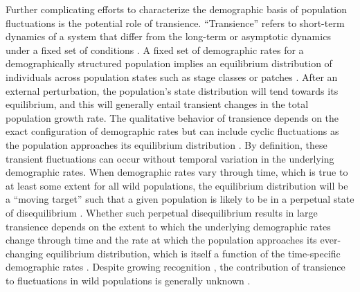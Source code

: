 \documentclass[11pt]{article}
\begin{document}
Further complicating efforts to characterize the demographic basis 
of population fluctuations is the potential role of transience.
``Transience'' refers to short-term dynamics of a system 
that differ from the long-term or asymptotic dynamics under a fixed set of conditions
\citep{hastings2010}.
A fixed set of demographic rates for a demographically structured population 
implies an equilibrium distribution
of individuals across population states such as stage classes or patches
\citep{caswell2001matrix}.
After an external perturbation, 
the population's state distribution will tend towards its equilibrium,
and this will generally entail transient changes 
in the total population growth rate.
The qualitative behavior of transience depends
on the exact configuration of demographic rates
but can include cyclic fluctuations 
as the population approaches its equilibrium distribution
\citep{caswell2001matrix}.
By definition, these transient fluctuations can occur without
temporal variation in the underlying demographic rates.
When demographic rates vary through time,
which is true to at least some extent for all wild populations,
the equilibrium distribution will be a ``moving target''
such that a given population is likely to be in a perpetual state of disequilibrium
\citep{fox2000population, koons2017understanding}.
Whether such perpetual disequilibrium results in large transience 
depends on the extent to which the underlying demographic rates change through time
and the rate at which the population approaches its ever-changing equilibrium distribution,
which is itself a function of the time-specific demographic rates
\citep{caswell2005reactivity, caswell2007sensitivity}.
Despite growing recognition
\citep{caswell2007sensitivity, koons2017understanding},
the contribution of transience to fluctuations in wild populations is generally unknown
\citep[but see][]{hoy2020fluctuations}.
\end{document}
